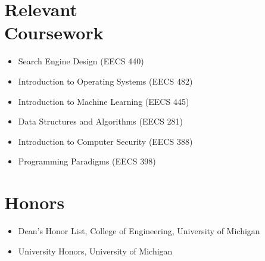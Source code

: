 \documentclass{mycv}
\begin{document}
\section{Relevant\\Coursework}
\begin{itemize}
  \item Search Engine Design (EECS 440)
  \item Introduction to Operating Systems (EECS 482)
  \item Introduction to Machine Learning (EECS 445)
  \item Data Structures and Algorithms (EECS 281)
  \item Introduction to Computer Security (EECS 388)
  \item Programming Paradigms (EECS 398)
\end{itemize}

\section{Honors}
\begin{itemize}
  \item Dean's Honor List, College of Engineering, University of Michigan
  \item University Honors, University of Michigan
\end{itemize}
\end{document}
